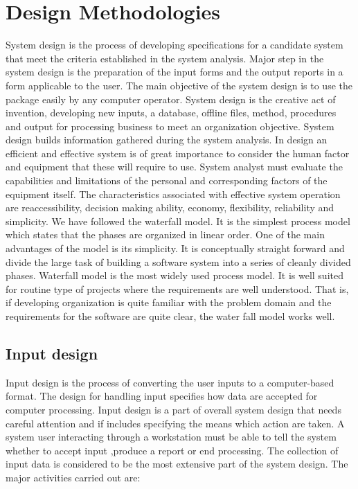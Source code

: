 \section{Design Methodologies}
System design is the process of developing specifications for a candidate system that meet the criteria established in the system analysis. Major step in the system design is the preparation of the input forms and the output reports in a form applicable to the user.
\newline
The main objective of the system design is to use the package easily by any computer operator. System design is the creative act of invention, developing new inputs, a database, offline files, method, procedures and output for processing business to meet an organization objective. System design builds information gathered during the system analysis.
\newline
In design an efficient and effective system is of great importance to consider the human factor and equipment that these will require to use. System analyst must evaluate the capabilities and limitations of the personal and corresponding factors of the equipment itself. The characteristics associated with effective system operation are reaccessibility, decision making ability, economy, flexibility, reliability and simplicity.
\newline
We have followed the waterfall model. It is the simplest process model which states that the phases are organized in linear order. One of the main advantages of the model is its simplicity. It is conceptually straight forward and divide the large task of building a software system into a series of cleanly divided phases.
\newline
Waterfall model is the most widely used process model. It is well suited for routine type of projects where the requirements are well understood. That is, if developing organization is quite familiar with the problem domain and the requirements for the software are quite clear, the water fall model works well.
\subsection*{Input design}
Input design is the process of converting the user inputs to a computer-based format. The design for handling input specifies how data are accepted for computer processing. Input design is a part of overall system design that needs careful attention and if includes specifying the means which action are taken. A system user interacting through a workstation must be able to tell the system whether to accept input ,produce a report or end processing. The collection of input data is considered to be the most extensive part of the system design. The major activities carried out are:

